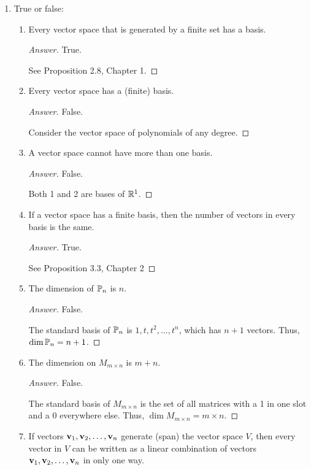 \documentclass[../psets.tex]{subfiles}
\begin{document}
\begin{enumerate}[label={\textbf{5.\arabic*.}}]
    \item True or false:
    \begin{enumerate}
        \item Every vector space that is generated by a finite set has a basis.
        \begin{proof}[Answer]
            True.\par
            See Proposition 2.8, Chapter 1.
        \end{proof}
        \item Every vector space has a (finite) basis.
        \begin{proof}[Answer]
            False.\par
            Consider the vector space of polynomials of any degree.
        \end{proof}
        \item A vector space cannot have more than one basis.
        \begin{proof}[Answer]
            False.\par
            Both 1 and 2 are bases of $\mathbb{R}^1$.
        \end{proof}
        \item If a vector space has a finite basis, then the number of vectors in every basis is the same.
        \begin{proof}[Answer]
            True.\par
            See Proposition 3.3, Chapter 2
        \end{proof}
        \item The dimension of $\mathbb{P}_n$ is $n$.
        \begin{proof}[Answer]
            False.\par
            The standard basis of $\mathbb{P}_n$ is $1,t,t^2,\dots,t^n$, which has $n+1$ vectors. Thus, $\dim\mathbb{P}_n=n+1$.
        \end{proof}
        \item The dimension on $M_{m\times n}$ is $m+n$.
        \begin{proof}[Answer]
            False.\par
            The standard basis of $M_{m\times n}$ is the set of all matrices with a 1 in one slot and a 0 everywhere else. Thus, $\dim M_{m\times n}=m\times n$.
        \end{proof}
        \item If vectors $\mathbf{v}_1,\mathbf{v}_2,\dots,\mathbf{v}_n$ generate (span) the vector space $V$, then every vector in $V$ can be written as a linear combination of vectors $\mathbf{v}_1,\mathbf{v}_2,\dots,\mathbf{v}_n$ in only one way.

\end{enumerate}
\end{enumerate}
\end{document}
